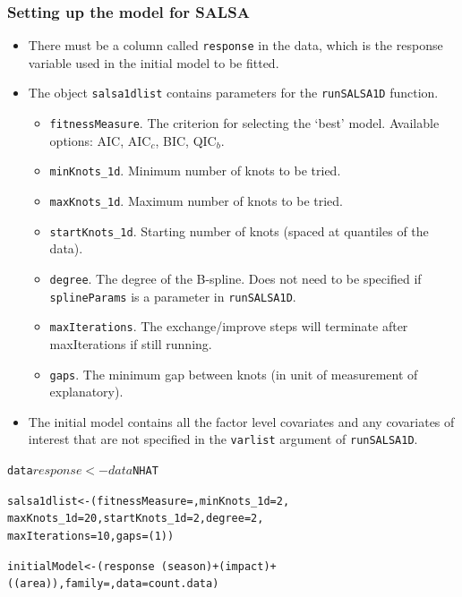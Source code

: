\begin{frame}[fragile]
\frametitle{Setting up the model for SALSA}
\begin{itemize}
\item There must be a column called {\tt response} in the data, which is the response variable used in the initial model to be fitted.
\item The object {\tt salsa1dlist} contains parameters for the {\tt runSALSA1D} function.  
\begin{itemize}
\item {\tt fitnessMeasure}. The criterion for selecting the `best' model.  Available options: AIC, AIC$_c$, BIC, QIC$_b$.
\item {\tt minKnots\_1d}. Minimum number of knots to be tried.
\item {\tt maxKnots\_1d}. Maximum number of knots to be tried.
\item {\tt startKnots\_1d}. Starting number of knots (spaced at quantiles of the data).
\item {\tt degree}. The degree of the B-spline. Does not need to be specified if {\tt splineParams} is a parameter in {\tt runSALSA1D}.
\item {\tt maxIterations}. The exchange/improve steps will terminate after maxIterations if still running.
\item {\tt gaps}. The minimum gap between knots (in unit of measurement of explanatory).
\end{itemize}
\item The initial model contains all the factor level covariates and any covariates of interest that are not specified in the {\tt varlist} argument of {\tt runSALSA1D}.
\end{itemize}

\begin{knitrout}\footnotesize
{}\color{fgcolor}\begin{kframe}
\begin{alltt}
data$response <- data$NHAT

salsa1dlist <- (fitnessMeasure = , minKnots_1d = 2, 
                    maxKnots_1d = 20, startKnots_1d = 2, degree = 2, 
                    maxIterations = 10, gaps = (1))

initialModel <- (response ~ (season) + (impact) + 
    ((area)), family = , data = count.data)


\end{alltt}
\end{kframe}
\end{knitrout}
\end{frame}
